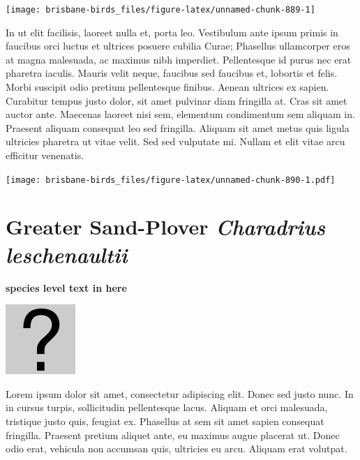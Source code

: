 \documentclass[]{book}
\let\origfigure\figure
\let\endorigfigure\endfigure
\renewenvironment{figure}[1][2] {
  \expandafter\origfigure\expandafter[H]
} {
  \endorigfigure
}
\begin{document}
\begin{figure}
\texttt{[image: brisbane-birds\_files/figure-latex/unnamed-chunk-889-1]} \caption{insert figure caption}\label{fig:unnamed-chunk-889}
\end{figure}

In ut elit facilisis, laoreet nulla et, porta leo. Vestibulum ante ipsum
primis in faucibus orci luctus et ultrices posuere cubilia Curae;
Phasellus ullamcorper eros at magna malesuada, ac maximus nibh
imperdiet. Pellentesque id purus nec erat pharetra iaculis. Mauris velit
neque, faucibus sed faucibus et, lobortis et felis. Morbi suscipit odio
pretium pellentesque finibus. Aenean ultrices ex sapien. Curabitur
tempus justo dolor, sit amet pulvinar diam fringilla at. Cras sit amet
auctor ante. Maecenas laoreet nisi sem, elementum condimentum sem
aliquam in. Praesent aliquam consequat leo sed fringilla. Aliquam sit
amet metus quis ligula ultricies pharetra ut vitae velit. Sed sed
vulputate mi. Nullam et elit vitae arcu efficitur venenatis.

\begin{figure}
\centering
\texttt{[image: brisbane-birds\_files/figure-latex/unnamed-chunk-890-1.pdf]}
\caption{\label{fig:unnamed-chunk-890}insert figure caption}
\end{figure}

\section{\texorpdfstring{Greater Sand-Plover \emph{Charadrius
leschenaultii}}{Greater Sand-Plover Charadrius leschenaultii}}\label{greater-sand-plover-charadrius-leschenaultii}

\textbf{species level text in here}

\begin{figure}
\centering
\includegraphics{assets/missing.png}
\caption{No image for species}
\end{figure}

Lorem ipsum dolor sit amet, consectetur adipiscing elit. Donec sed justo
nunc. In in cursus turpis, sollicitudin pellentesque lacus. Aliquam et
orci malesuada, tristique justo quis, feugiat ex. Phasellus at sem sit
amet sapien consequat fringilla. Praesent pretium aliquet ante, eu
maximus augue placerat ut. Donec odio erat, vehicula non accumsan quis,
ultricies eu arcu. Aliquam erat volutpat.
\end{document}
